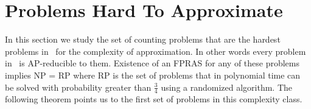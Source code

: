 \begin{comment}
Consider a Markov chain with each state representing a solution of the problem.
The transitions are to the same solution with probability of \(\frac{1}{2}\) 
and to a similar solution with probability \(\frac{1}{2}\).

There is usually a sequence of instances (the length of sequence is polynomial) such that
the first element of the sequence is the instance  that we are trying to solve
and the last element is a trivial instance.
The ratio of answers between two consecutive elements 
is estimated by sampling along a random walk.
The final answer is the product of the ratios and the answer for trivial instance. 

In order for Markov chain Monte-Carlo to work, the chain must be ergodic and rapidly mixing.
Mixing time is the minimum length of a random walk such that the required
quantity is measured with desired approximation and if mixing
time is polynomial then the chain is said to be rapidly mixing.

The \pname{\#Match} problem is solved as follows.
A suitable sequence \(\bl\) of real numbers beginning with one and ending
with zero is chosen. The ratios \(Z_G(\bl_i)/Z_G(\bl_{i+1})\) are estimated 
by sampling along a random walk on the Markov chain. \(Z_G(1)\) is the product of
all the ratios.

The \ldkcol\ problem is solved as follows. Let \mG\ be a graph with \mn\ vertices
and \mm\ edges. Let \(\bG\) be a sequence of subgraphs of \mG\ where
\(\bG_0=G\) and \(\bG_{i+1}\) is obtained from \(\bG_i\) by removing a single edge. 
The last element \(\bG_m\) is an empty graph which is k-colorable in \(k^n\) ways.
The ratio \(Z(G_i)/Z(G_{i+1})\) is estimated
by sampling along a random walk on the Markov chain. \(Z(G)\) is the product of all the
ratios and the number of k-colorings of \(\bG_m\).
\end{comment}

\section{Problems Hard To Approximate} \label{sec:hard}
In this section we study the set of counting problems that are the hardest problems in \cp\
for the complexity of approximation. In other words every
problem in \cp\ is AP-reducible to them.
Existence of an FPRAS for any of these problems implies NP = RP where 
RP is the set of problems that in polynomial time can be solved with probability
greater than \(\frac{3}{4}\) using a randomized algorithm. The following theorem 
points us to the first set of problems in this complexity class.

